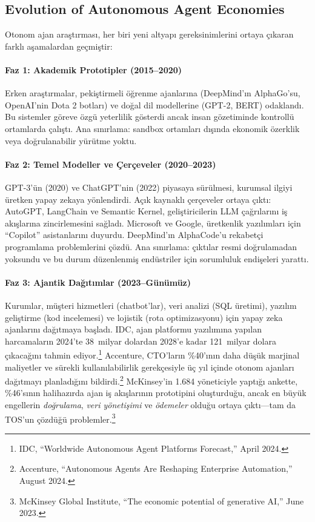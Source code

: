 \documentclass[11pt]{article}
\begin{document}
\subsection{Evolution of Autonomous Agent Economies}
Otonom ajan araştırması, her biri yeni altyapı gereksinimlerini ortaya çıkaran farklı aşamalardan geçmiştir:

\paragraph{Faz 1: Akademik Prototipler (2015--2020)} Erken araştırmalar, pekiştirmeli öğrenme ajanlarına (DeepMind'ın AlphaGo'su, OpenAI'nin Dota 2 botları) ve doğal dil modellerine (GPT-2, BERT) odaklandı. Bu sistemler göreve özgü yeterlilik gösterdi ancak insan gözetiminde kontrollü ortamlarda çalıştı. Ana sınırlama: sandbox ortamları dışında ekonomik özerklik veya doğrulanabilir yürütme yoktu.

\paragraph{Faz 2: Temel Modeller ve Çerçeveler (2020--2023)} GPT-3'ün (2020) ve ChatGPT'nin (2022) piyasaya sürülmesi, kurumsal ilgiyi üretken yapay zekaya yönlendirdi. Açık kaynaklı çerçeveler ortaya çıktı: AutoGPT, LangChain ve Semantic Kernel, geliştiricilerin LLM çağrılarını iş akışlarına zincirlemesini sağladı. Microsoft ve Google, üretkenlik yazılımları için ``Copilot'' asistanlarını duyurdu. DeepMind'ın AlphaCode'u rekabetçi programlama problemlerini çözdü. Ana sınırlama: çıktılar resmi doğrulamadan yoksundu ve bu durum düzenlenmiş endüstriler için sorumluluk endişeleri yarattı.

\paragraph{Faz 3: Ajantik Dağıtımlar (2023--Günümüz)} Kurumlar, müşteri hizmetleri (chatbot'lar), veri analizi (SQL üretimi), yazılım geliştirme (kod incelemesi) ve lojistik (rota optimizasyonu) için yapay zeka ajanlarını dağıtmaya başladı. IDC, ajan platformu yazılımına yapılan harcamaların 2024'te 38~milyar dolardan 2028'e kadar 121~milyar dolara çıkacağını tahmin ediyor.\footnote{IDC, ``Worldwide Autonomous Agent Platforms Forecast,'' April 2024.} Accenture, CTO'ların \%40'ının daha düşük marjinal maliyetler ve sürekli kullanılabilirlik gerekçesiyle üç yıl içinde otonom ajanları dağıtmayı planladığını bildirdi.\footnote{Accenture, ``Autonomous Agents Are Reshaping Enterprise Automation,'' August 2024.} McKinsey'in 1.684 yöneticiyle yaptığı ankette, \%46'sının halihazırda ajan iş akışlarının prototipini oluşturduğu, ancak en büyük engellerin \emph{doğrulama}, \emph{veri yönetişimi} ve \emph{ödemeler} olduğu ortaya çıktı---tam da TOS'un çözdüğü problemler.\footnote{McKinsey Global Institute, ``The economic potential of generative AI,'' June 2023.}
\end{document}
